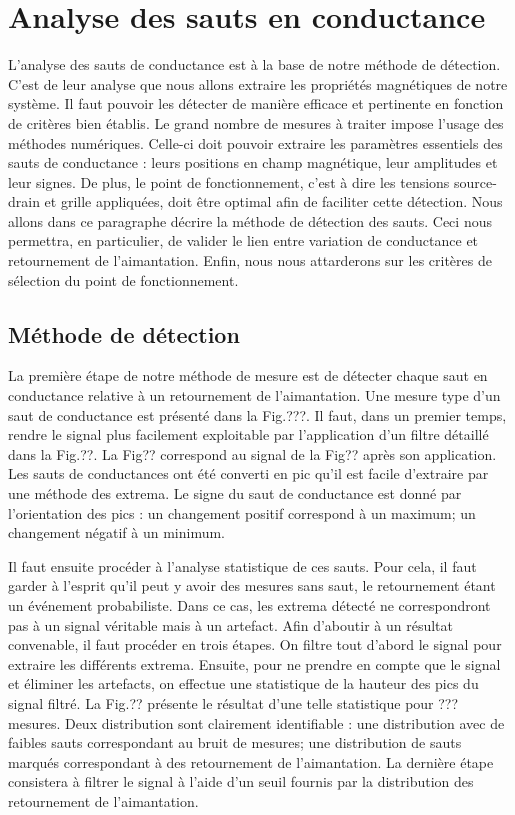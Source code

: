 \section{Analyse des sauts en conductance}
L'analyse des sauts de conductance est à la base de notre méthode de détection. C'est de leur analyse que nous allons extraire les propriétés magnétiques de notre système. Il faut pouvoir les détecter de manière efficace et pertinente en fonction de critères bien établis. Le grand nombre de mesures à traiter impose l'usage des méthodes numériques. Celle-ci doit pouvoir extraire les paramètres essentiels des sauts de conductance : leurs positions en champ magnétique, leur amplitudes et leur signes. De plus, le point de fonctionnement, c'est à dire les tensions source-drain et grille appliquées, doit être optimal afin de faciliter cette détection. Nous allons dans ce paragraphe décrire la méthode de détection des sauts. Ceci nous permettra, en particulier, de valider le lien entre variation de conductance et retournement de l'aimantation. Enfin, nous nous attarderons sur les critères de sélection du point de fonctionnement.

\subsection{Méthode de détection}
La première étape de notre méthode de mesure est de détecter chaque saut en conductance relative à un retournement de l'aimantation. Une mesure type d'un saut de conductance est présenté dans la Fig.???. Il faut, dans un premier temps, rendre le signal plus facilement exploitable par l'application d'un filtre détaillé dans la Fig.??. La Fig?? correspond au signal de la Fig?? après son application. Les sauts de conductances ont été converti en pic qu'il est facile d'extraire par une méthode des extrema. Le signe du saut de conductance est donné par l'orientation des pics : un changement positif correspond à un maximum; un changement négatif à un minimum.

Il faut ensuite procéder à l'analyse statistique de ces sauts. Pour cela, il faut garder à l'esprit qu'il peut y avoir des mesures sans saut, le retournement étant un événement probabiliste. Dans ce cas, les extrema détecté ne correspondront pas à un signal véritable mais à un artefact. Afin d'aboutir à un résultat convenable, il faut procéder en trois étapes. On filtre tout d'abord le signal pour extraire les différents extrema. Ensuite, pour ne prendre en compte que le signal et éliminer les artefacts, on effectue une statistique de la hauteur des pics du signal filtré. La Fig.?? présente le résultat d'une telle statistique pour ??? mesures. Deux distribution sont clairement identifiable : une distribution avec de faibles sauts correspondant au bruit de mesures; une distribution de sauts marqués correspondant à des retournement de l'aimantation. La dernière étape consistera à filtrer le signal à l'aide d'un seuil fournis par la distribution des retournement de l'aimantation.

